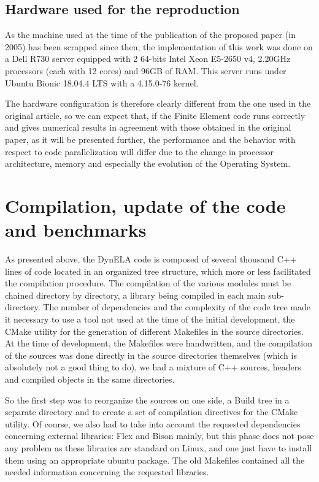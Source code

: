 \subsection{Hardware used for the reproduction}

As the machine used at the time of the publication of the proposed paper (in 2005) has been scrapped since then, the implementation of this work was done on a Dell R730 server equipped with 2 64-bits Intel Xeon E5-2650 v4, 2.20GHz processors (each with 12 cores) and 96GB of RAM. This server runs under Ubuntu Bionic 18.04.4 LTS with a 4.15.0-76 kernel. 

The hardware configuration is therefore clearly different from the one used in the original article, so we can expect that, if the Finite Element code runs correctly and gives numerical results in agreement with those obtained in the original paper, as it will be presented further, the performance and the behavior with respect to code parallelization will differ due to the change in processor architecture, memory and especially the evolution of the Operating System.

\section{Compilation, update of the code and benchmarks}

As presented above, the DynELA code is composed of several thousand C++ lines of code located in an organized tree structure, which more or less facilitated the compilation procedure. The compilation of the various modules must be chained directory by directory, a library being compiled in each main sub-directory. The number of dependencies and the complexity of the code tree made it necessary to use a tool not used at the time of the initial development, the CMake \cite{CMake} utility for the generation of different Makefiles in the source directories. At the time of development, the Makefiles were handwritten, and the compilation of the sources was done directly in the source directories themselves (which is absolutely not a good thing to do), we had a mixture of C++ sources, headers and compiled objects in the same directories.

So the first step was to reorganize the sources on one side, a Build tree in a separate directory and to create a set of compilation directives for the CMake utility. Of course, we also had to take into account the requested dependencies concerning external libraries: Flex and Bison \cite{Levine:2009} mainly, but this phase does not pose any problem as these libraries are standard on Linux, and one just have to install them using an appropriate ubuntu package. The old Makefiles contained all the needed information concerning the requested libraries.

